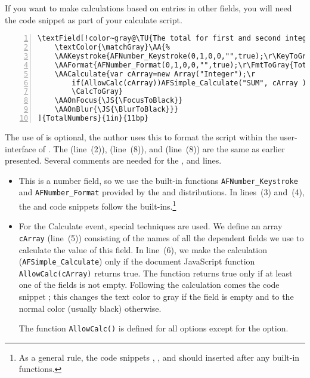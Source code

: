 \documentclass{article}
\begin{document}
If you want to make calculations based on entries in other fields, you will need
the code snippet  as part of your calculate script.
\begin{Verbatim}[xleftmargin=\parindent,commandchars={!~@},numbers=left,numbersep=3bp,fontsize=\small]
\textField[!color~gray@\TU{The total for first and second integers}
    \textColor{\matchGray}\AA{%
    \AAKeystroke{AFNumber_Keystroke(0,1,0,0,"",true);\r\KeyToGray}
    \AAFormat{AFNumber_Format(0,1,0,0,"",true);\r\FmtToGray{Total}}
    \AACalculate{var cArray=new Array("Integer");\r
        if(AllowCalc(cArray))AFSimple_Calculate("SUM", cArray );\r
        \CalcToGray}
    \AAOnFocus{\JS{\FocusToBlack}}
    \AAOnBlur{\JS{\BlurToBlack}}}
]{TotalNumbers}{1in}{11bp}
\end{Verbatim}
The use of  is optional, the author uses this to format the script
within the user-interface of . The  (line~(2)),
 (line~(8)), and  (line~(8)) are the same as earlier presented.
Several comments are needed for the ,  and  lines.
\begin{itemize}
    \item This is a number field, so we use the built-in functions
        \texttt{AFNumber\_Keystroke} and \texttt{AFNumber\_Format} provided
        by the  and 
        distributions. In lines~(3) and~(4), the  and
         code snippets follow the built-ins.\footnote{As a general rule,
        the code snippets , , and
         should inserted after any built-in functions.}
    \item For the Calculate event, special techniques are used. We define
        an array \texttt{cArray} (line~(5)) consisting of the names of all
        the dependent fields we use to calculate the value of this field.
        In line~(6), we make the calculation (\texttt{AFSimple\_Calculate})
        only if the document JavaScript function \texttt{AllowCalc(cArray)}
        returns true. The function returns true only if at least one of the
        fields is not empty. Following the calculation comes the code
        snippet ; this changes the text color to gray if the
        field is empty and to the normal color (usually black) otherwise.

        The function \texttt{AllowCalc()} is defined for all options except
        for the  option.
\end{itemize}
\end{document}
